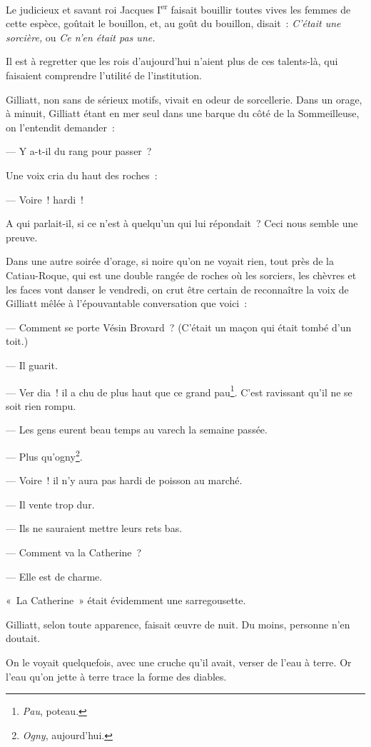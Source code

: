 \documentclass[french,twoside]{book} %
\begin{document}
Le judicieux et savant roi Jacques I\textsuperscript{er} faisait bouillir toutes vives les femmes de cette espèce, goûtait le bouillon, et, au goût du bouillon, disait : \emph{C’était une sorcière,} ou \emph{Ce n’en était pas une.}\par
Il est à regretter que les rois d’aujourd’hui n’aient plus de ces talents-là, qui faisaient comprendre l’utilité de l’institution.\par
Gilliatt, non sans de sérieux motifs, vivait en odeur de sorcellerie. Dans un orage, à minuit, Gilliatt étant en mer seul dans une barque du côté de la Sommeilleuse, on l’entendit demander :\par
 — Y a-t-il du rang pour passer ?\par
Une voix cria du haut des roches :\par
— Voire ! hardi !\par
A qui parlait-il, si ce n’est à quelqu’un qui lui répondait ? Ceci nous semble une preuve.\par
Dans une autre soirée d’orage, si noire qu’on ne voyait rien, tout près de la Catiau-Roque, qui est une double rangée de roches où les sorciers, les chèvres et les faces vont danser le vendredi, on crut être certain de reconnaître la voix de Gilliatt mêlée à l’épouvantable conversation que voici :\par
— Comment se porte Vésin Brovard ? (C’était un maçon qui était tombé d’un toit.)\par
— Il guarit.\par
— Ver dia ! il a chu de plus haut que ce grand pau\footnote{ \noindent \emph{Pau}, poteau.
 }. C’est ravissant qu’il ne se soit rien rompu.\par
— Les gens eurent beau temps au varech la semaine passée.\par
— Plus qu’ogny\footnote{ \noindent \emph{Ogny}, aujourd’hui.
 }.\par
— Voire ! il n’y aura pas hardi de poisson au marché.\par
— Il vente trop dur.\par
— Ils ne sauraient mettre leurs rets bas.\par
— Comment va la Catherine ?\par
— Elle est de charme.\par
« La Catherine » était évidemment une sarregousette.\par
Gilliatt, selon toute apparence, faisait œuvre de nuit. Du moins, personne n’en doutait.\par
 On le voyait quelquefois, avec une cruche qu’il avait, verser de l’eau à terre. Or l’eau qu’on jette à terre trace la forme des diables.\par
\end{document}
